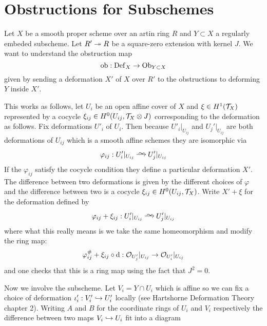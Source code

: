 \documentclass[12pt]{article}
\begin{document}
\section{Obstructions for Subschemes}

\newcommand{\Ob}{\mathrm{Ob}}

Let $X$ be a smooth proper scheme over an artin ring $R$ and $Y \subset X$ a regularly embeded subscheme. Let $R' \twoheadrightarrow R$ be a square-zero extension with kernel $J$. We want to understand the obstruction map
\[ \ob : \Def_X \to \Ob_{Y \subset X} \]
given by sending a deformation $X'$ of $X$ over $R'$ to the obstructions to deforming $Y$ inside $X'$.
\par 
This works as follows, let $U_i$ be an open affine cover of $X$ and $\xi \in H^1(\mathcal{T}_X)$ represented by a \cech cocycle $\xi_{ij} \in H^0(U_{ij}, \mathcal{T}_X \otimes J)$ corresponding to the deformation as follows. Fix deformations $U'_i$ of $U_i$. Then because $U'_i |_{U_{ij}}$ and $U_j'|_{U_{ij}}$ are both deformations of $U_{ij}$ which is a smooth affine schemes they are isomorphic via
\[ \varphi_{ij} : U'_i |_{U_{ij}} \iso U_j'|_{U_{ij}} \]
If the $\varphi_{ij}$ satisfy the cocycle condition they define a particular deformation $X'$. The difference between two deformations is given by the different choices of $\varphi$ and the difference between two is a \cech cocycle $\xi_{ij} \in H^0(U_{ij}, \mathcal{T}_X)$. Write $X' + \xi$ for the deformation defined by
\[ \varphi_{ij} + \xi_{ij} :  U'_i |_{U_{ij}} \iso U_j'|_{U_{ij}} \]
where what this really means is we take the same homeomorphism and modify the ring map:
\[ \varphi_{ij}^{\#} + \xi_{ij} \circ \mathrm{d} : \mathcal{O}_{U_j'}|_{U_{ij}} \to \mathcal{O}_{U'_i} |_{U_{ij}} \]
and one checks that this is a ring map using the fact that $J^2 = 0$.
\par 
Now we involve the subscheme. Let $V_i = Y \cap U_i$ which is affine so we can fix a choice of deformation $\iota_i' : V_i' \hookrightarrow U_i'$ locally (see Hartshorne Deformation Theory chapter 2). Writing $A$ and $B$ for the coordinate rings of $U_i$ and $V_i$ respectively the difference between two maps $V_i \hookrightarrow U_i$ fit into a diagram
\begin{center}
\end{center}
\end{document}
